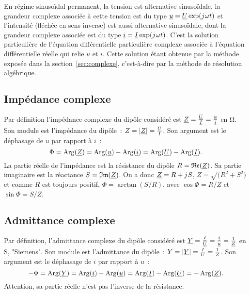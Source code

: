 En régime sinusoïdal permanent, la tension est alternative sinusoïdale, la 
grandeur complexe associée à cette tension est du type \(\underline{u} = \underline{U} 
\exp({j\mkern1mu}\omega t)\) et l'intensité (fléchée en sens inverse) est aussi 
alternative sinusoïdale, dont la grandeur complexe associée est du type 
\(\underline{i} = \underline{I} \exp({j\mkern1mu}\omega t)\). C'est la solution particulière de 
l'équation différentielle particulière complexe associée à l'équation 
différentielle réelle qui relie \(u\) et \(i\). Cette solution étant 
obtenue par la méthode exposée dans la section~\ref{sec:complexe}, 
c'est-à-dire par la méthode de résolution algébrique.
\subsection{Impédance complexe}
Par définition l'impédance complexe du dipôle considéré est \(\underline{Z} = 
\frac{\underline{U}}{\underline{I}}=\frac{\underline{u}}{\underline{i}}\) en \(\si{\ohm}\). Son module est 
l'impédance du dipôle~: \(Z = \left\lvert\underline{Z}\right\rvert = \frac{U}{I}\). Son argument 
est le déphasage de \(u\) par rapport à \(i\)~:
\begin{equation}
  \Phi = \operatorname{Arg}(\underline{Z}) = \operatorname{Arg}(\underline{u}) - \operatorname{Arg}(\underline{i}) = \operatorname{Arg}(\underline{U}) - \operatorname{Arg}(\underline{I}).
\end{equation}
La partie réelle de l'impédance est la résistance du dipôle \(R = 
\mathfrak{Re}(\underline{Z})\). Sa partie imaginaire est la réactance \(S=\mathfrak{Im}(\underline{Z})\). On a 
donc \(\underline{Z} = R + {j\mkern1mu} S\), \(Z = \sqrt(R^2+S^2)\) et comme \(R\) est 
toujours positif, \(\Phi = \arctan(S/R)\), avec \(\cos\Phi = R/Z\) et 
\(\sin\Phi=S/Z\).
\subsection{Admittance complexe}
Par définition, l'admittance complexe du dipôle considéré est \(\underline{Y} = 
\frac{\underline{I}}{\underline{U}}=\frac{\underline{i}}{\underline{u}}=\frac{1}{\underline{Z}}\) en \(\si{\siemens}\), 
"Siemens". Son module est l'admittance du dipôle~: \(Y = \left\lvert\underline{Y}\right\rvert = 
\frac{I}{U} = \frac{1}{Z}\). Son argument est le déphasage de \(i\) par 
rapport à \(u\)~:
\begin{equation}
  -\Phi = \operatorname{Arg}(\underline{Y}) = \operatorname{Arg}(\underline{i}) - \operatorname{Arg}(\underline{u}) = \operatorname{Arg}(\underline{I}) - \operatorname{Arg}(\underline{U}) = 
  -\operatorname{Arg}(\underline{Z}).
\end{equation}
Attention, sa partie réelle n'est pas l'inverse de la résistance.
